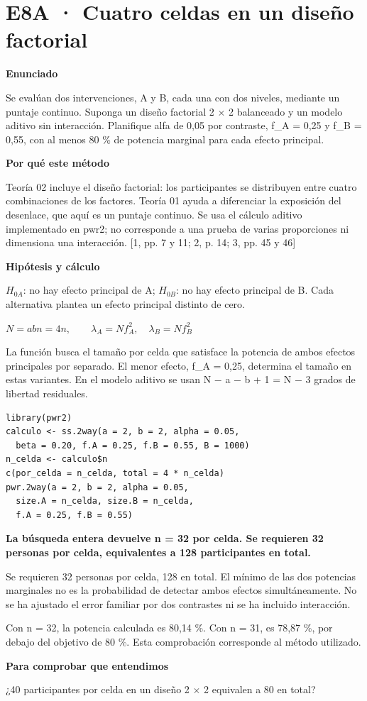 \documentclass[10pt,a4paper]{article}
\newcommand{\etiqueta}[1]{\par{\bfseries\color{Blue}#1}\par}
\newcommand{\cajares}[1]{\par\colorbox{Pale}{\parbox{\dimexpr\linewidth-2\fboxsep}{\vspace{4pt}\textbf{\color{Navy}#1}\vspace{4pt}}}\par}
\begin{document}
\section*{E8A · Cuatro celdas en un diseño factorial}
\etiqueta{Enunciado}
Se evalúan dos intervenciones, A y B, cada una con dos niveles, mediante un puntaje continuo. Suponga un diseño factorial 2 \ensuremath{\times} 2 balanceado y un modelo aditivo sin interacción. Planifique alfa de 0,05 por contraste, f\_A = 0,25 y f\_B = 0,55, con al menos 80 \% de potencia marginal para cada efecto principal.
\etiqueta{Por qué este método}
Teoría 02 incluye el diseño factorial: los participantes se distribuyen entre cuatro combinaciones de los factores. Teoría 01 ayuda a diferenciar la exposición del desenlace, que aquí es un puntaje continuo. Se usa el cálculo aditivo implementado en pwr2; no corresponde a una prueba de varias proporciones ni dimensiona una interacción. [1, pp. 7 y 11; 2, p. 14; 3, pp. 45 y 46]
\etiqueta{Hipótesis y cálculo}
$H_{0A}$: no hay efecto principal de A; $H_{0B}$: no hay efecto principal de B. Cada alternativa plantea un efecto principal distinto de cero.

$N=abn=4n,\qquad \lambda_A=Nf_A^2,\quad \lambda_B=Nf_B^2$

La función busca el tamaño por celda que satisface la potencia de ambos efectos principales por separado. El menor efecto, f\_A = 0,25, determina el tamaño en estas variantes. En el modelo aditivo se usan N \ensuremath{-} a \ensuremath{-} b + 1 = N \ensuremath{-} 3 grados de libertad residuales.
\begin{Verbatim}
library(pwr2)
calculo <- ss.2way(a = 2, b = 2, alpha = 0.05,
  beta = 0.20, f.A = 0.25, f.B = 0.55, B = 1000)
n_celda <- calculo$n
c(por_celda = n_celda, total = 4 * n_celda)
pwr.2way(a = 2, b = 2, alpha = 0.05,
  size.A = n_celda, size.B = n_celda,
  f.A = 0.25, f.B = 0.55)
\end{Verbatim}
\cajares{La búsqueda entera devuelve n = 32 por celda. Se requieren 32 personas por celda, equivalentes a 128 participantes en total.}
Se requieren 32 personas por celda, 128 en total. El mínimo de las dos potencias marginales no es la probabilidad de detectar ambos efectos simultáneamente. No se ha ajustado el error familiar por dos contrastes ni se ha incluido interacción.

{\small\color{Gray}Con n = 32, la potencia calculada es 80,14 \%. Con n = 31, es 78,87 \%, por debajo del objetivo de 80 \%. Esta comprobación corresponde al método utilizado.}
\etiqueta{Para comprobar que entendimos}
¿40 participantes por celda en un diseño 2 \ensuremath{\times} 2 equivalen a 80 en total?
\end{document}
